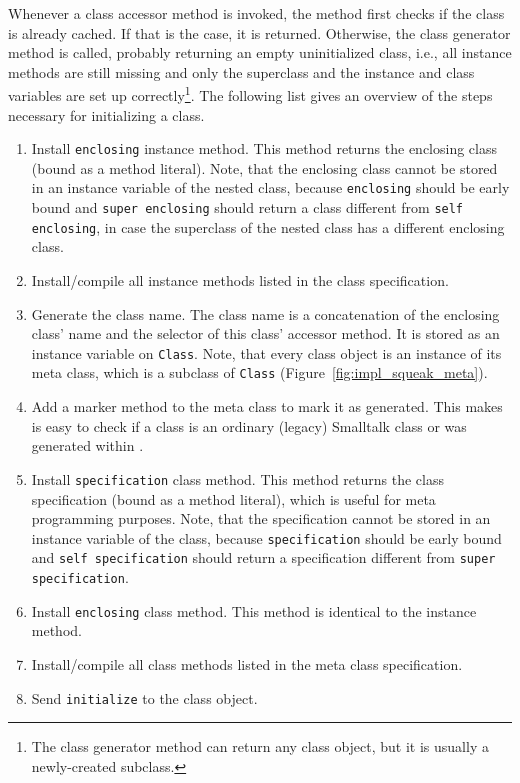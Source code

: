 Whenever a class accessor method is invoked, the method first checks if the class is already cached. If that is the case, it is returned. Otherwise, the class generator method is called, probably returning an empty uninitialized class, i.e., all instance methods are still missing and only the superclass and the instance and class variables are set up correctly\footnote{The class generator method can return any class object, but it is usually a newly-created subclass.}. The following list gives an overview of the steps necessary for initializing a class.

\begin{enumerate}
	\item Install \texttt{enclosing} instance method. This method returns the enclosing class (bound as a method literal). Note, that the enclosing class cannot be stored in an instance variable of the nested class, because \texttt{enclosing} should be early bound and \texttt{super enclosing} should return a class different from \texttt{self enclosing}, in case the superclass of the nested class has a different enclosing class.
	\item Install/compile all instance methods listed in the class specification.
	\item Generate the class name. The class name is a concatenation of the enclosing class' name and the selector of this class' accessor method. It is stored as an instance variable on \texttt{Class}. Note, that every class object is an instance of its meta class, which is a subclass of \texttt{Class} (Figure~\ref{fig:impl_squeak_meta}).
	\item Add a marker method to the meta class to mark it as generated. This makes is easy to check if a class is an ordinary (legacy) Smalltalk class or was generated within \msname.
	\item Install \texttt{specification} class method. This method returns the class specification (bound as a method literal), which is useful for meta programming purposes. Note, that the specification cannot be stored in an instance variable of the class, because \texttt{specification} should be early bound and \texttt{self specification} should return a specification different from \texttt{super specification}.
	\item Install \texttt{enclosing} class method. This method is identical to the instance method.
	\item Install/compile all class methods listed in the meta class specification.
	\item Send \texttt{initialize} to the class object.
\end{enumerate}

